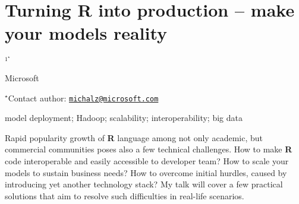 \documentclass[\main/boa.tex]{subfiles}
\begin{document}
\section{Turning R into production -- make your models reality}

\begin{center}
  {\bf {}$^{1^\star}$}
\end{center}

\vskip 0.3cm

\begin{affiliations}
\begin{enumerate}
\begin{minipage}{0.915\textwidth}
\centering
\item Microsoft \\[-2pt]
\end{minipage}
\end{enumerate}
$^\star$Contact author: \href{mailto:michalz@microsoft.com}{\nolinkurl{michalz@microsoft.com}}\\
\end{affiliations}

\vskip 0.5cm

\begin{minipage}{0.915\textwidth}
\keywords model deployment; Hadoop; scalability; interoperability; big data
\end{minipage}

\vskip 0.8cm

Rapid popularity growth of \textbf{R} language among not only academic,
but commercial communities poses also a few technical challenges. How to
make \textbf{R} code interoperable and easily accessible to developer
team? How to scale your models to sustain business needs? How to
overcome initial hurdles, caused by introducing yet another technology
stack? My talk will cover a few practical solutions that aim to resolve
such difficulties in real-life scenarios.
\end{document}
